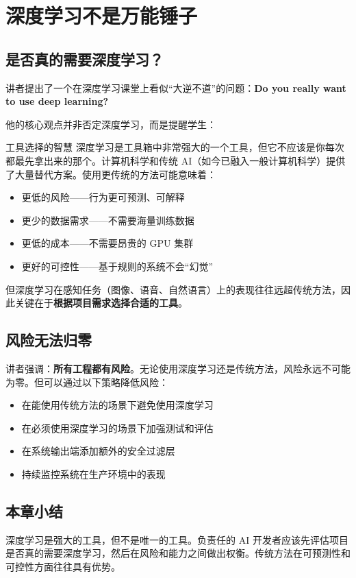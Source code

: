 \section{深度学习不是万能锤子}

\subsection{是否真的需要深度学习？}

讲者提出了一个在深度学习课堂上看似``大逆不道''的问题：\textbf{Do you really want to use deep learning?}

他的核心观点并非否定深度学习，而是提醒学生：

\begin{knowledgebox}{工具选择的智慧}
深度学习是工具箱中非常强大的一个工具，但它不应该是你每次都最先拿出来的那个。计算机科学和传统 AI（如今已融入一般计算机科学）提供了大量替代方案。使用更传统的方法可能意味着：
\begin{itemize}
    \item 更低的风险——行为更可预测、可解释
    \item 更少的数据需求——不需要海量训练数据
    \item 更低的成本——不需要昂贵的 GPU 集群
    \item 更好的可控性——基于规则的系统不会``幻觉''
\end{itemize}
但深度学习在感知任务（图像、语音、自然语言）上的表现往往远超传统方法，因此关键在于\textbf{根据项目需求选择合适的工具}。
\end{knowledgebox}

\subsection{风险无法归零}

讲者强调：\textbf{所有工程都有风险}。无论使用深度学习还是传统方法，风险永远不可能为零。但可以通过以下策略降低风险：

\begin{itemize}
    \item 在能使用传统方法的场景下避免使用深度学习
    \item 在必须使用深度学习的场景下加强测试和评估
    \item 在系统输出端添加额外的安全过滤层
    \item 持续监控系统在生产环境中的表现
\end{itemize}

\subsection{本章小结}

深度学习是强大的工具，但不是唯一的工具。负责任的 AI 开发者应该先评估项目是否真的需要深度学习，然后在风险和能力之间做出权衡。传统方法在可预测性和可控性方面往往具有优势。

